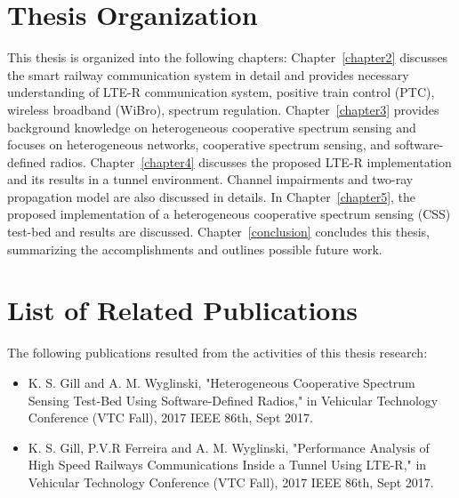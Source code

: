 \section{Thesis Organization}
This thesis is organized into the following chapters: Chapter~\ref{chapter2} discusses the smart railway communication system in detail and provides necessary understanding of LTE-R communication system, positive train control (PTC), wireless broadband (WiBro), spectrum regulation. Chapter~\ref{chapter3} provides background knowledge on heterogeneous cooperative spectrum sensing and focuses on heterogeneous networks, cooperative spectrum sensing, and software-defined radios. Chapter~\ref{chapter4} discusses the proposed LTE-R implementation and its results in a tunnel environment. Channel impairments and two-ray propagation model are also discussed in details.  In Chapter~\ref{chapter5}, the proposed implementation of a heterogeneous cooperative spectrum sensing (CSS) test-bed and results are discussed. Chapter~\ref{conclusion} concludes this thesis, summarizing the accomplishments and outlines possible future work.

\section{List of Related Publications}
The following publications resulted from the activities of this thesis research:
\begin{itemize}
\item K. S. Gill and A. M. Wyglinski, "Heterogeneous Cooperative Spectrum Sensing
Test-Bed Using Software-Defined Radios," in Vehicular Technology Conference (VTC Fall), 2017 IEEE 86th, Sept 2017.

\item K. S. Gill, P.V.R Ferreira and A. M. Wyglinski, "Performance Analysis of High Speed Railways Communications Inside a Tunnel Using LTE-R," in Vehicular Technology Conference (VTC Fall), 2017 IEEE 86th, Sept 2017.

\end{itemize}


